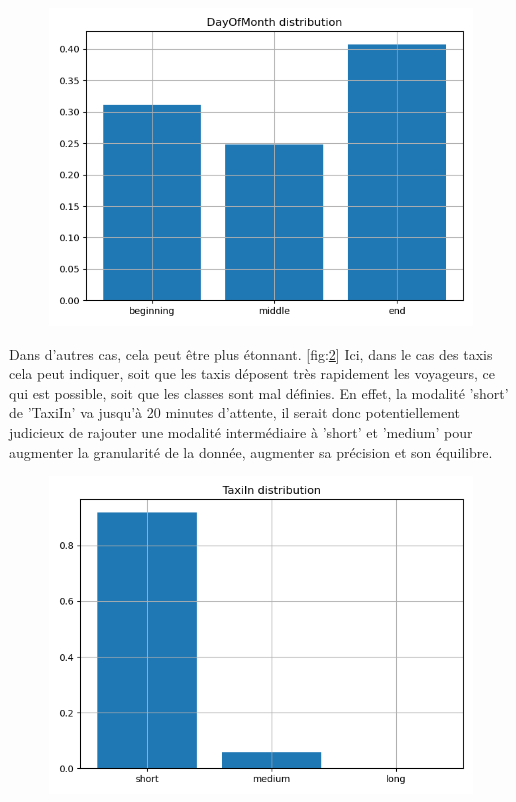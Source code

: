 \begin{figure}[H]
  \centering
  \includegraphics[scale=1]{images/DayOfMonth_distribution.png}
  \caption{}
  \label{fig:DayOfMonth}
\end{figure}

Dans d'autres cas, cela peut être plus étonnant. [fig:\ref{fig:TaxiIn}]
Ici, dans le cas des taxis cela peut indiquer, soit que les taxis déposent très rapidement les voyageurs, ce qui est possible, soit que les classes sont mal définies.
En effet, la modalité 'short' de 'TaxiIn' va jusqu'à 20 minutes d'attente, il serait donc potentiellement judicieux de rajouter une modalité intermédiaire à 'short' et 'medium' pour augmenter la granularité de la donnée, augmenter sa précision et son équilibre.

\begin{figure}[H]
  \centering
  \includegraphics[scale=1]{images/TaxiIn_distribution.png}
  \caption{}
  \label{fig:TaxiIn}
\end{figure}

